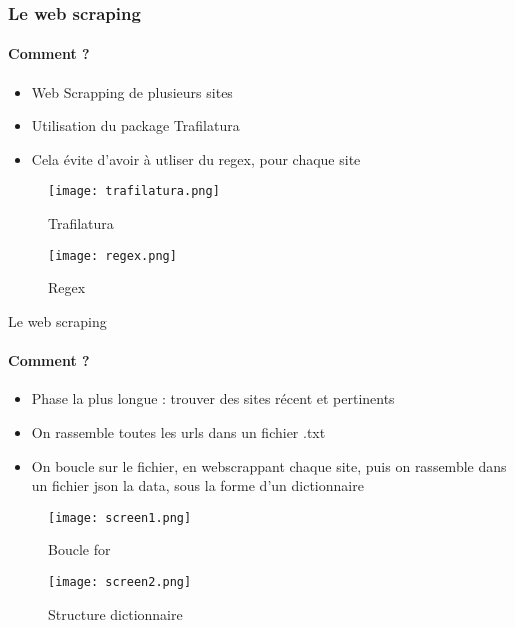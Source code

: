 \documentclass{beamer}
\begin{document}
\begin{frame}
\frametitle{Le web scraping}
\framesubtitle{Comment ? }



\begin{itemize}
    \item Web Scrapping de plusieurs sites
    \item Utilisation du package Trafilatura
    \item Cela évite d'avoir à utliser du regex, pour chaque site
\end{itemize}

\begin{figure}[ht]
    \centering
    \begin{minipage}{0.25\linewidth}
        \centering
        \texttt{[image: trafilatura.png]}
        \caption{Trafilatura}
        \label{fig:image1}
    \end{minipage}
    \hfill
    \begin{minipage}{0.45\linewidth}
        \centering
        \texttt{[image: regex.png]}
        \caption{Regex}
        \label{fig:image2}
    \end{minipage}
\end{figure}

\end{frame}

\begin{frame}{Le web scraping}
\framesubtitle{Comment ?}

\begin{itemize}
    \item Phase la plus longue : trouver des sites récent et pertinents
    \item On rassemble toutes les urls dans un fichier .txt
    \item On boucle sur le fichier, en webscrappant chaque site, puis on rassemble dans un fichier json la data, sous la forme d’un dictionnaire
\end{itemize}

\begin{figure}[ht]
    \centering
    \begin{minipage}{0.45\linewidth}
        \centering
        \texttt{[image: screen1.png]}
        \caption{Boucle for}
        \label{fig:image1}
    \end{minipage}
    \hfill
    \begin{minipage}{0.25\linewidth}
        \centering
        \texttt{[image: screen2.png]}
        \caption{Structure dictionnaire}
        \label{fig:image2}
    \end{minipage}
\end{figure}
    
\end{frame}
\end{document}
